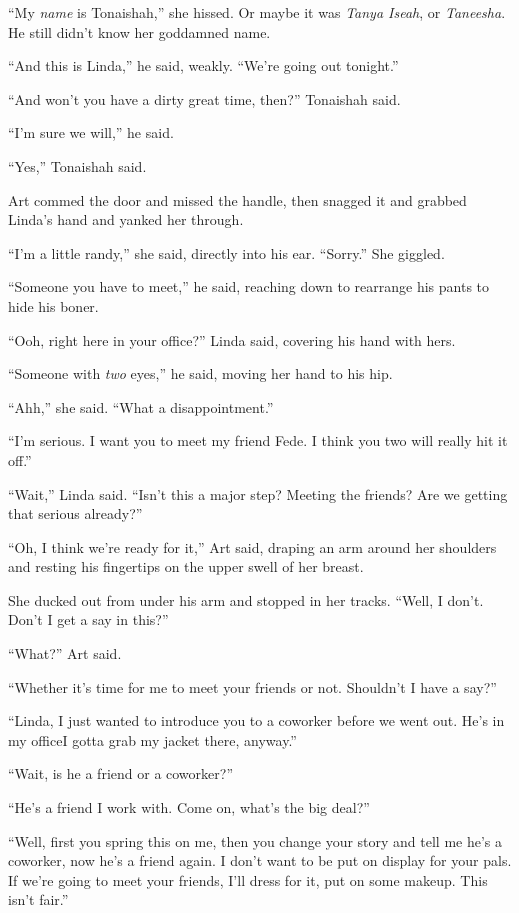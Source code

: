 “My \emph{name} is Tonaishah,” she hissed. Or maybe it was
\emph{Tanya Iseah}, or \emph{Taneesha}. He still didn’t know her
goddamned name.

“And this is Linda,” he said, weakly. “We’re going out tonight.”

“And won’t you have a dirty great time, then?” Tonaishah said.

“I’m sure we will,” he said.

“Yes,” Tonaishah said.

Art commed the door and missed the handle, then snagged it and
grabbed Linda’s hand and yanked her through.

“I’m a little randy,” she said, directly into his ear. “Sorry.” She
giggled.

“Someone you have to meet,” he said, reaching down to rearrange his
pants to hide his boner.

“Ooh, right here in your office?” Linda said, covering his hand
with hers.

“Someone with \emph{two} eyes,” he said, moving her hand to his
hip.

“Ahh,” she said. “What a disappointment.”

“I’m serious. I want you to meet my friend Fede. I think you two
will really hit it off.”

“Wait,” Linda said. “Isn’t this a major step? Meeting the friends?
Are we getting that serious already?”

“Oh, I think we’re ready for it,” Art said, draping an arm around
her shoulders and resting his fingertips on the upper swell of her
breast.

She ducked out from under his arm and stopped in her tracks. “Well,
I don’t. Don’t I get a say in this?”

“What?” Art said.

“Whether it’s time for me to meet your friends or not. Shouldn’t I
have a say?”

“Linda, I just wanted to introduce you to a coworker before we went
out. He’s in my office{\dash}I gotta grab my jacket there, anyway.”

“Wait, is he a friend or a coworker?”

“He’s a friend I work with. Come on, what’s the big deal?”

“Well, first you spring this on me, then you change your story and
tell me he’s a coworker, now he’s a friend again. I don’t want to
be put on display for your pals. If we’re going to meet your
friends, I’ll dress for it, put on some makeup. This isn’t fair.”

